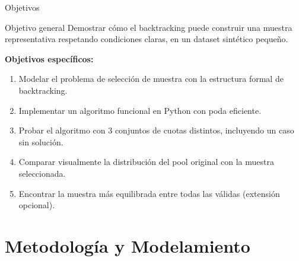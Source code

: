 \documentclass[aspectratio=169, 10pt]{beamer}
\begin{document}
\begin{frame}{Objetivos}
  \begin{block}{Objetivo general}
    Demostrar cómo el backtracking puede construir una muestra representativa
    respetando condiciones claras, en un dataset sintético pequeño.
  \end{block}

  \vspace{0.4cm}
  \textbf{Objetivos específicos:}
  \begin{enumerate}
    \item Modelar el problema de selección de muestra con la estructura formal de backtracking.
    \item Implementar un algoritmo funcional en Python con poda eficiente.
    \item Probar el algoritmo con 3 conjuntos de cuotas distintos, incluyendo un caso sin solución.
    \item Comparar visualmente la distribución del pool original con la muestra seleccionada.
    \item Encontrar la muestra más equilibrada entre todas las válidas (extensión opcional).
  \end{enumerate}
\end{frame}


\section{Metodología y Modelamiento}
\end{document}
